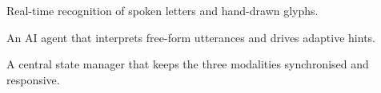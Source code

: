 \begin{description}[leftmargin=1.2em,style=nextline]
  \item[\textbf{Accurate input}] Real-time recognition of spoken letters and hand-drawn glyphs.
  \item[\textbf{Context-aware logic}] An AI agent that interprets free-form utterances and drives adaptive hints.
  \item[\textbf{Unified control}] A central state manager that keeps the three modalities synchronised and responsive.
\end{description}
